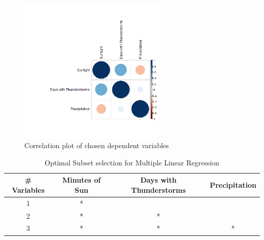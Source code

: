 \begin{figure}
  \centering
  \includegraphics[width=7cm]{../data/img/correlation_plot.PNG}
  \caption{Correlation plot of chosen dependent variables}
  \label{fig:correlation_plot}
\end{figure}

\begin{table}[ht]
 \begin{centering}
 \caption{Multiple Linear Regression for Predicting Temperature (Adjusted $R^{2} = 0.7969$, $n = 321$)}
 \label{tab:lin_regression}
 \end{centering}
\end{table}

\begin{table}[ht]
 \begin{centering}
 \begin{tabular}{|c|c c c|} 
 \hline
  \# Variables & Minutes of Sun & Days with Thunderstorms & Precipitation \\
 \hline
 1 & * & & \\
  \hline
 2 & * & * & \\ 
  \hline
 3 & * & * & *\\ 
 \hline
 \end{tabular}
 \caption{Optimal Subset selection for Multiple Linear Regression}
 \label{tab:optimal_selection}
 \end{centering}
\end{table}

